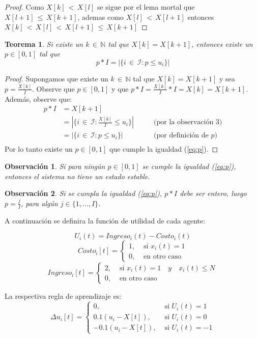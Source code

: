 \documentclass{article}
\newtheorem{teor}{Teorema}
\newtheorem{obs}{Observación}
\begin{document}
\begin{proof}
Como $X[k]\,{<}\,X[l]$ se sigue por el lema mortal que $X[l{+}1]\,{\leq}\,X[k{+}1]$, ademas como $X[l]\,{<}\,X[l{+}1]$ entonces $X[k]\,{<}\,X[l]\,{<}\,X[l{+}1]\,{\leq}\,X[k{+}1]$
\end{proof}

\begin{teor}
Si existe un $k\,{\in}\,\mathbb{N}$ tal que $X[k]=X[k{+}1]$, entonces existe un $p\in[0,1]$ tal que
\begin{equation}\label{eq:p}
p*I=|\{i\,{\in}\,\mathcal{I}:p\leq u_i\}|
\end{equation}
\end{teor}
\begin{proof}

Supongamos que existe un $k\,{\in}\,\mathbb{N}$ tal que $X[k]=X[k{+}1]$ y sea $p=\frac{X[k]}{I}$. Observe que $p\in[0,1]$ y que $p*I=\frac{X[k]}{I}*I=X[k]=X[k{+}1]$. Además, observe que:
\begin{align*}
p*I&=X[k{+}1]\\
&=|\{i\,{\in}\,\mathcal{I}:\frac{X[k]}{I}\leq u_i\}| &\qquad\mbox{(por la observación 3)}\\
&=|\{i\,{\in}\,\mathcal{I}:p\leq u_i\}| &\qquad\mbox{(por definición de $p$)}\\
\end{align*}
Por lo tanto existe un $p\in[0,1]$ que cumple la igualdad (\ref{eq:p}).
\end{proof}

\begin{obs}
Si para ningún $p\in[0,1]$ se cumple la igualdad (\ref{eq:p}), entonces el sistema no tiene un estado estable.
\end{obs}

\begin{obs}
Si se cumpla la igualdad (\ref{eq:p}), $p*I$ debe ser entero, luego $p=\frac{j}{I}$, para algún $j\in\{1,\ldots,I\}$.
\end{obs}

A continuación se definira la función de utilidad de cada agente:

\begin{equation}
    U_i(t)= Ingreso_i(t)-Costo_i(t)
\end{equation}
\begin{equation}
    Costo_i[t]=\begin{cases} 1, & \mbox{ si }x_i(t)=1\\ 0, & \mbox{ en otro caso  }\end{cases}
\end{equation}
\begin{equation}
    Ingreso_i[t]=\begin{cases} 2, & \mbox{ si  }x_i(t)=1 \quad y \quad x_i(t)\leq N \\ 0, & \mbox{ en otro caso  }\end{cases}
\end{equation}

La respectiva regla de aprendizaje es:
\begin{equation}
    {\Delta}u_i[t]=\begin{cases} 0, & \mbox{ si  }U_i(t)=1 \\ 0.1(u_i-X[t]), & \mbox{ si }U_i(t)=0\\-0.1(u_i-X[t]), & \mbox{ si }U_i(t)=-1 \end{cases}
\end{equation}
\end{document}
